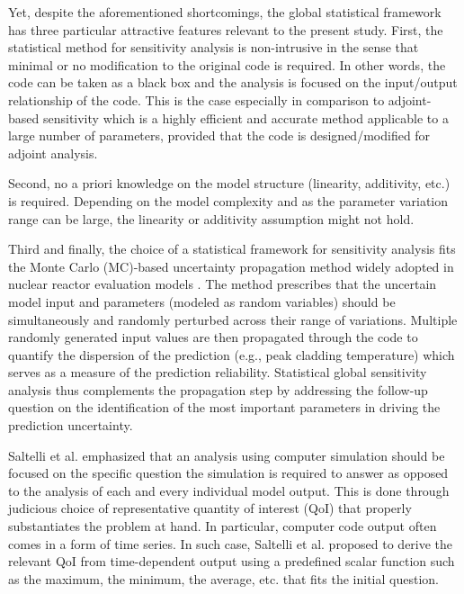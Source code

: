 Yet, despite the aforementioned shortcomings, 
the global statistical framework has three particular attractive features relevant to the present study. 
First, the statistical method for sensitivity analysis is non-intrusive in the sense that minimal or no modification to the original code is required. 
In other words, the code can be taken as a black box and the analysis is focused on the input/output relationship \cite{Saltelli2008} of the code. 
This is the case especially in comparison to adjoint-based sensitivity \cite{Cacuci2000,Ionescu-Bujor2000} which is a highly efficient and accurate method applicable to a large number of parameters, 
provided that the code is designed/modified for adjoint analysis.

Second, no a priori knowledge on the model structure (linearity, additivity, etc.) is required. 
Depending on the model complexity and as the parameter variation range can be large, 
the linearity or additivity assumption might not hold.

Third and finally, 
the choice of a statistical framework for sensitivity analysis fits the Monte Carlo (MC)-based uncertainty propagation method widely adopted in nuclear reactor evaluation models \cite{Boyack1990, Nutt2004, Wallis2007, Glaeser2008}. 
The method prescribes that the uncertain model input and parameters (modeled as random variables) 
should be simultaneously and randomly perturbed across their range of variations. 
Multiple randomly generated input values are then propagated through the code to quantify the dispersion of the prediction (e.g., peak cladding temperature) 
which serves as a measure of the prediction reliability. 
Statistical global sensitivity analysis thus complements the propagation step 
by addressing the follow-up question on the identification of the most important parameters in driving the prediction uncertainty. 

Saltelli et al. \cite{Saltelli2006} emphasized that an analysis using computer simulation 
should be focused on the specific question the simulation is required to answer 
as opposed to the analysis of each and every individual model output. 
This is done through judicious choice of representative quantity of interest (QoI) 
that properly substantiates the problem at hand. 
In particular, computer code output often comes in a form of time series. 
In such case, Saltelli et al. \cite{Saltelli2008,Saltelli2004} proposed to derive the relevant QoI from time-dependent output 
using a predefined scalar function such as the maximum, the minimum, the average, etc. that fits the initial question.

